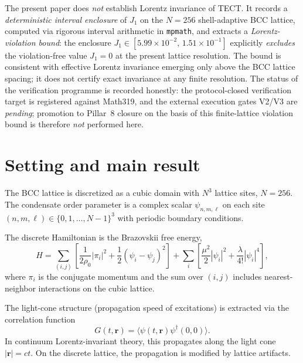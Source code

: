 The present paper does \emph{not} establish Lorentz invariance of
TECT. It records a \emph{deterministic interval enclosure} of $J_1$
on the $N=256$ shell-adaptive BCC lattice, computed via rigorous
interval arithmetic in \texttt{mpmath}, and extracts a
\emph{Lorentz-violation bound}: the enclosure
$J_1\in[5.99\times 10^{-2},\,1.51\times 10^{-1}]$ explicitly
\emph{excludes} the violation-free value $J_1 = 0$ at the present
lattice resolution. The bound is consistent with effective Lorentz
invariance emerging only above the BCC lattice spacing; it does not
certify exact invariance at any finite resolution. The status of the
verification programme is recorded honestly:
the protocol-closed verification target is registered against
Math319, and the external execution gates V2/V3 are
\emph{pending}; promotion to Pillar~8 closure on the basis of this
finite-lattice violation bound is therefore \emph{not} performed
here.

\section{Setting and main result}
The BCC lattice is discretized as a cubic domain with $N^3$ lattice sites,
$N = 256$. The condensate order parameter is a complex scalar $\psi_{n,m,\ell}$
on each site $(n, m, \ell) \in \{0, 1, \ldots, N-1\}^3$ with periodic
boundary conditions.

The discrete Hamiltonian is the Brazovskii free energy,
\begin{equation}
H = \sum_{(i,j)} \left[\frac{1}{2\rho_0}|\pi_i|^2 + \frac{1}{2}(\psi_i - \psi_j)^2\right]
+ \sum_i \left[\frac{\mu^2}{2}|\psi_i|^2 + \frac{\lambda}{4!}|\psi_i|^4\right],
\label{eq:ham}
\end{equation}
where $\pi_i$ is the conjugate momentum and the sum over $(i,j)$ includes
nearest-neighbor interactions on the cubic lattice.

The light-cone structure (propagation speed of excitations) is extracted via
the correlation function
\begin{equation}
G(t, \mathbf{r}) = \langle \psi(t, \mathbf{r})\psi^\dagger(0, 0) \rangle.
\label{eq:corr}
\end{equation}
In continuum Lorentz-invariant theory, this propagates along the light cone
$|\mathbf{r}| = c t$. On the discrete lattice, the propagation is modified by
lattice artifacts.

